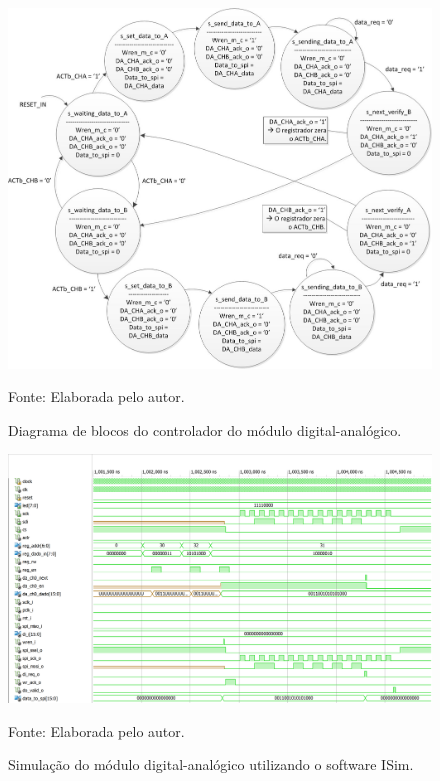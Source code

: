\begin{figure}[!htb]
	\centering
	\caption{Diagrama de blocos do controlador do módulo digital-analógico.}
	\includegraphics[scale = .9]{Imagens/controlador_DAC}
	
	Fonte: Elaborada pelo autor.
	
	\label{controlador_DAC}
\end{figure}

\begin{figure}[!htb]
	\centering
	\caption{Simulação do módulo digital-analógico utilizando o software ISim.}
	\includegraphics[scale = .8, angle = 90]{Imagens/ISim_DAC_.pdf}
	
	Fonte: Elaborada pelo autor.
	
	\label{ISim_DAC}
\end{figure}

